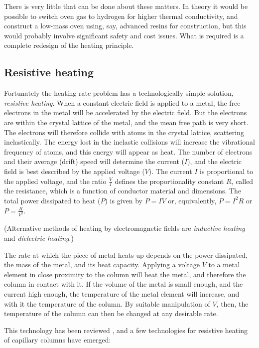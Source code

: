 There is very little that can be done about these matters. In theory it would be
possible to switch oven gas to hydrogen for higher thermal conductivity, and
construct a low-mass oven using, say, advanced resins for construction, but this
would probably involve significant safety and cost issues. What is required is a
complete redesign of the heating principle.

\subsection{Resistive heating}

Fortunately the heating rate problem has a technologically simple solution,
\textit{resistive heating}. When a constant electric field is applied to a
metal, the free electrons in the metal will be accelerated by the electric
field. But the electrons are within the crystal lattice of the metal, and the
mean free path is very short. The electrons will therefore collide with atoms in
the crystal lattice, scattering inelastically. The energy lost in the inelastic
collisions will increase the vibrational frequency of atoms, and this energy will
appear as heat. The number of electrons and their average (drift) speed will
determine the current ($I$), and the electric field is best described by the
applied voltage ($V$). The current $I$ is proportional to the applied voltage,
and the ratio $\frac{V}{I}$ defines the proportionality constant $R$, called the
resistance, which is a function of conductor material and dimensions. The total
power dissipated to heat ($P$) is given by $P=IV$ or, equivalently, $P=I^2R$
or $P=\frac{R}{V^2}$.

(Alternative methods of heating by electromagnetic fields are \textit{inductive
heating} and \textit{dielectric heating}.)

The rate at which the piece of metal heats up depends on the power dissipated,
the mass of the metal, and its heat capacity. Applying a voltage \(V\) to a
metal element in close proximity to the column will heat the metal, and
therefore the column in contact with it. If the volume of the metal is small
enough, and the current high enough, the temperature of the metal element will
increase, and with it the temperature of the column. By suitable manipulation of
\(V\), then, the temperature of the column can then be changed at any desirable
rate.

This technology has been reviewed \autocite{Wang2012,Jacobs2013}, and a few
technologies for resistive heating of capillary columns have emerged:


